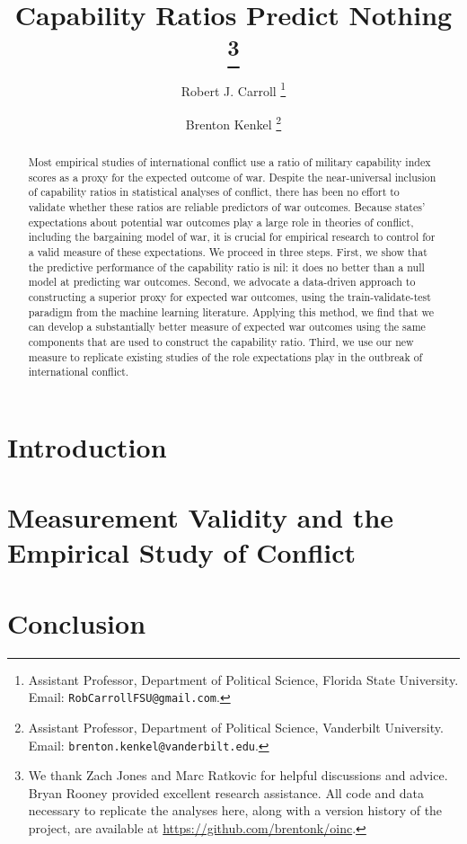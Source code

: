 \documentclass[11pt,oneside]{article}
\title{
  Capability Ratios Predict Nothing%
  \thanks{%
    We thank Zach Jones and Marc Ratkovic for helpful discussions and advice.
    Bryan Rooney provided excellent research assistance.
    All code and data necessary to replicate the analyses here, along with a version history of the project, are available at \url{https://github.com/brentonk/oinc}.
  }%
}
\author{%
  Robert J. Carroll%
  \thanks{%
    Assistant Professor, Department of Political Science, Florida State University.  Email:  \nolinkurl{RobCarrollFSU@gmail.com}.
  }%
  \and%
  Brenton Kenkel%
  \thanks{
    Assistant Professor, Department of Political Science, Vanderbilt University.
    Email: \nolinkurl{brenton.kenkel@vanderbilt.edu}.
  }%
}
\begin{document}
\maketitle

\begin{abstract}
  Most empirical studies of international conflict use a ratio of military capability index scores as a proxy for the expected outcome of war.
  Despite the near-universal inclusion of capability ratios in statistical analyses of conflict, there has been no effort to validate whether these ratios are reliable predictors of war outcomes.
  Because states' expectations about potential war outcomes play a large role in theories of conflict, including the bargaining model of war, it is crucial for empirical research to control for a valid measure of these expectations.
  We proceed in three steps.
  First, we show that the predictive performance of the capability ratio is nil: it does no better than a null model at predicting war outcomes.
  Second, we advocate a data-driven approach to constructing a superior proxy for expected war outcomes, using the train-validate-test paradigm from the machine learning literature.
  Applying this method, we find that we can develop a substantially better measure of expected war outcomes using the same components that are used to construct the capability ratio.
  Third, we use our new measure to replicate existing studies of the role expectations play in the outbreak of international conflict.
\end{abstract}

\clearpage


\section{Introduction}











\section{Measurement Validity and the Empirical Study of Conflict}


\section{Conclusion}


\newpage


\end{document}
